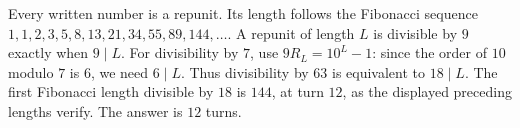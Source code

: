 Every written number is a repunit. Its length follows the Fibonacci sequence $1,1,2,3,5,8,13,21,34,55,89,144,\ldots$. A repunit of length $L$ is divisible by $9$ exactly when $9\mid L$. For divisibility by $7$, use $9R_L=10^L-1$: since the order of $10$ modulo $7$ is $6$, we need $6\mid L$. Thus divisibility by $63$ is equivalent to $18\mid L$. The first Fibonacci length divisible by $18$ is $144$, at turn $12$, as the displayed preceding lengths verify. The answer is $\boxed{12}$ turns.

